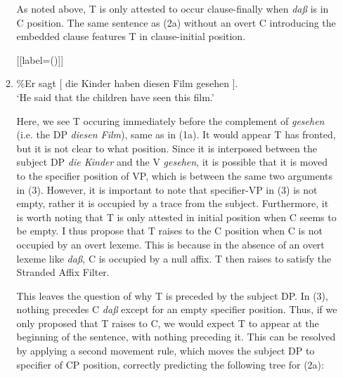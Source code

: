 \documentclass[12pt]{article}
\begin{document}
\begin{enumerate}[label=\textbf{\arabic*.}]
\begin{enumerate}[label=(\arabic*)]
	As noted above, T is only attested to occur clause-finally when \emph{daß} is in C position. The same
	sentence as (2a) without an overt C introducing the embedded clause features T in clause-initial position.

	[{[label=(\arabic*)]}]
	\item \%Er sagt [ die Kinder haben diesen Film gesehen ].\\
	`He said that the children have seen this film.'

	Here, we see T occuring immediately before the complement of \emph{gesehen} (i.e. the DP \emph{diesen Film}), same as in (1a). It would appear
	T has fronted, but it is not clear to what position. Since it is interposed between the subject DP \emph{die
	Kinder} and the V \emph{gesehen}, it is possible that it is moved to the specifier position of VP, which is
	between the same two arguments in (3). However, it is important to note that specifier-VP in (3) is not empty,
	rather it is occupied by a trace from the subject. Furthermore, it is worth noting that T is only attested
	in initial position when C seems to be empty. I thus propose that T raises to the C position when C is not
	occupied by an overt lexeme. This is because in the absence of an overt lexeme like \emph{daß}, C is occupied
	by a null affix. T then raises to satisfy the Stranded Affix Filter.

	This leaves the question of why T is preceded by the subject DP. In (3), nothing precedes C \emph{daß} except for an
	empty specifier position. Thus, if we only proposed that T raises to C, we would expect T to appear at the
	beginning of the sentence, with nothing preceding it. This can be resolved by applying a second movement rule,
	which moves the subject DP to specifier of CP position, correctly predicting the following tree for (2a):


\end{enumerate}
\end{enumerate}
\end{document}
